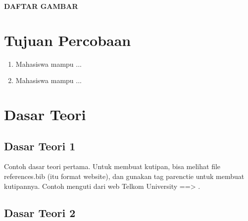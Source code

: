\documentclass[letterpaper]{article}
\begin{document}
\tableofcontents

\newpage



\renewcommand{\listfigurename}{}

\begin{center}
    \large\textbf{DAFTAR GAMBAR}
\end{center}

\listoffigures

\newpage






\section{Tujuan Percobaan}

 {\leftskip=1cm
  \begin{enumerate}
      \item Mahasiswa mampu ...
      \item Mahasiswa mampu ...
  \end{enumerate}
 }


\section{Dasar Teori}

\subsection{Dasar Teori 1}

{\leftskip=1cm
    \hspace{1cm}Contoh dasar teori pertama. Untuk membuat kutipan, bisa melihat file references.bib (itu format website), dan gunakan tag parenctie untuk membuat kutipannya. Contoh menguti dari web Telkom University ==> \parencite{telkomSistemOperasi}.
    \par}
    
\subsection{Dasar Teori 2}
    
\end{document}
